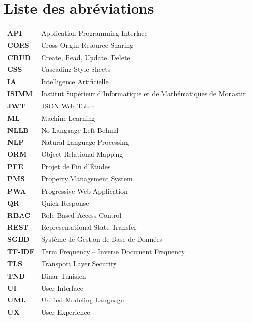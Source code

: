 \chapter*{Liste des abréviations}

\begin{tabularx}{\textwidth}{p{3.5cm}X}
\textbf{API}         & Application Programming Interface \\
\textbf{CORS}        & Cross-Origin Resource Sharing \\
\textbf{CRUD}        & Create, Read, Update, Delete \\
\textbf{CSS}         & Cascading Style Sheets \\
\textbf{IA}          & Intelligence Artificielle \\
\textbf{ISIMM}       & Institut Supérieur d'Informatique et de Mathématiques de Monastir \\
\textbf{JWT}         & JSON Web Token \\
\textbf{ML}          & Machine Learning \\
\textbf{NLLB}        & No Language Left Behind \\
\textbf{NLP}         & Natural Language Processing \\
\textbf{ORM}         & Object-Relational Mapping \\
\textbf{PFE}         & Projet de Fin d'Études \\
\textbf{PMS}         & Property Management System \\
\textbf{PWA}         & Progressive Web Application \\
\textbf{QR}          & Quick Response \\
\textbf{RBAC}        & Role-Based Access Control \\
\textbf{REST}        & Representational State Transfer \\
\textbf{SGBD}        & Système de Gestion de Base de Données \\
\textbf{TF-IDF}      & Term Frequency -- Inverse Document Frequency \\
\textbf{TLS}         & Transport Layer Security \\
\textbf{TND}         & Dinar Tunisien \\
\textbf{UI}          & User Interface \\
\textbf{UML}         & Unified Modeling Language \\
\textbf{UX}          & User Experience \\
\end{tabularx}
\newpage
